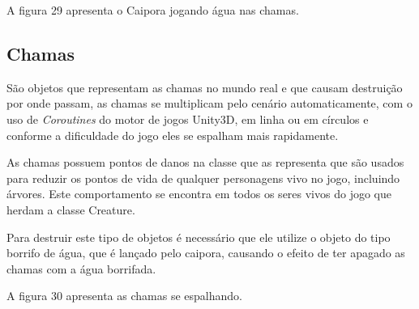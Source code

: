 A figura 29 apresenta o Caipora jogando água nas chamas.

\begin{figure}[h!]
		\centering
	\end{figure}
	
	
	
\subsection{Chamas}
São objetos que representam as chamas no mundo real e que causam destruição por onde passam, as chamas se multiplicam pelo cenário automaticamente, com o uso de \textit{Coroutines} do motor de jogos Unity3D,  em linha ou em círculos e conforme a dificuldade do jogo eles se espalham mais rapidamente. 

As chamas possuem pontos de danos na classe que as representa que são usados para reduzir os pontos de vida de qualquer personagens vivo no jogo, incluindo árvores. Este comportamento se encontra em todos os seres vivos do jogo que herdam a classe Creature. 

Para destruir este tipo de objetos é necessário que ele utilize o objeto do tipo borrifo de água, que é lançado pelo caipora, causando o efeito de ter apagado as chamas com a água borrifada.

A figura 30 apresenta as chamas se espalhando.

\begin{figure}[h!]
		\centering
	\end{figure}
	
